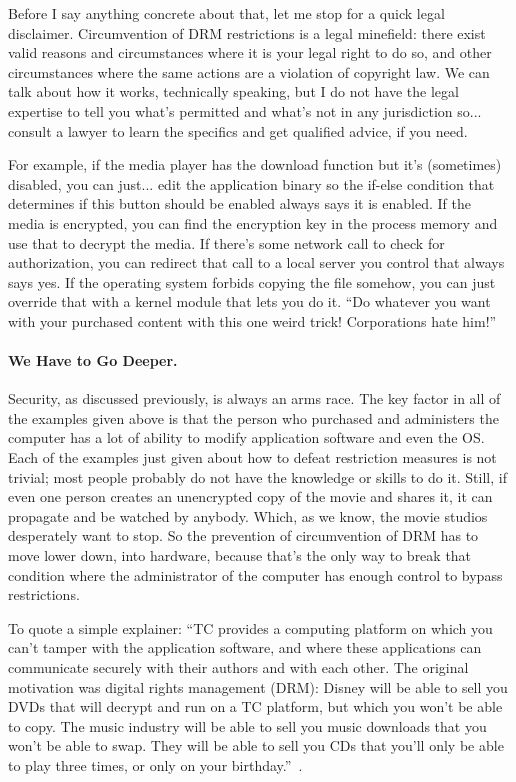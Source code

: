 Before I say anything concrete about that, let me stop for a quick legal disclaimer. Circumvention of DRM restrictions is a legal minefield: there exist valid reasons and circumstances where it is your legal right to do so, and other circumstances where the same actions are a violation of copyright law. We can talk about how it works, technically speaking, but I do not have the legal expertise to tell you what's permitted and what's not in any jurisdiction so... consult a lawyer to learn the specifics and get qualified advice, if you need.

For example, if the media player has the download function but it's (sometimes) disabled, you can just... edit the application binary so the if-else condition that determines if this button should be enabled always says it is enabled. If the media is encrypted, you can find the encryption key in the process memory and use that to decrypt the media. If there's some network call to check for authorization, you can redirect that call to a local server you control that always says yes. If the operating system forbids copying the file somehow, you can just override that with a kernel module that lets you do it. ``Do whatever you want with your purchased content with this one weird trick! Corporations hate him!''

\paragraph{We Have to Go Deeper.} Security, as discussed previously, is always an arms race. The key factor in all of the examples given above is that the person who purchased and administers the computer has a lot of ability to modify application software and even the OS. Each of the examples just given about how to defeat restriction measures is not trivial; most people probably do not have the knowledge or skills to do it. Still, if even one person creates an unencrypted copy of the movie and shares it, it can propagate and be watched by anybody. Which, as we know, the movie studios desperately want to stop. So the prevention of circumvention of DRM has to move lower down, into hardware, because that's the only way to break that condition where the administrator of the computer has enough control to bypass restrictions.

To quote a simple explainer: ``TC provides a computing platform on which you can't tamper with the application software, and where these applications can communicate securely with their authors and with each other. The original motivation was digital rights management (DRM): Disney will be able to sell you DVDs that will decrypt and run on a TC platform, but which you won't be able to copy. The music industry will be able to sell you music downloads that you won't be able to swap. They will be able to sell you CDs that you'll only be able to play three times, or only on your birthday.''~\cite{tc}.

